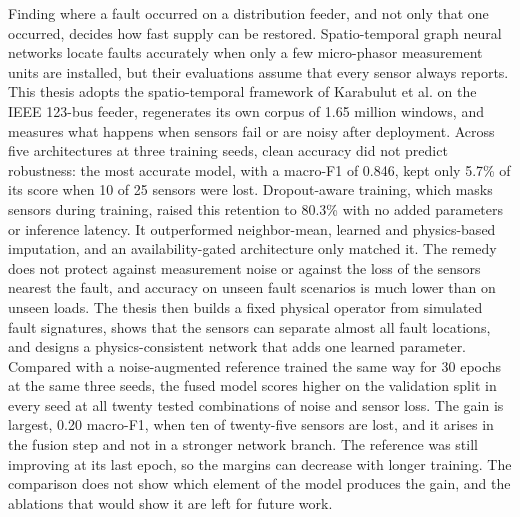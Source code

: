 \documentclass[MTech]{ugthesis}
\begin{document}
\abstract
\begin{doublespacing}
\normalfont
{\noindent Finding where a fault occurred on a distribution feeder, and not only that one occurred, decides how fast supply can be restored. Spatio-temporal graph neural networks locate faults accurately when only a few micro-phasor measurement units are installed, but their evaluations assume that every sensor always reports. This thesis adopts the spatio-temporal framework of Karabulut et al. on the IEEE 123-bus feeder, regenerates its own corpus of 1.65 million windows, and measures what happens when sensors fail or are noisy after deployment. Across five architectures at three training seeds, clean accuracy did not predict robustness: the most accurate model, with a macro-F1 of 0.846, kept only 5.7\% of its score when 10 of 25 sensors were lost. Dropout-aware training, which masks sensors during training, raised this retention to 80.3\% with no added parameters or inference latency. It outperformed neighbor-mean, learned and physics-based imputation, and an availability-gated architecture only matched it. The remedy does not protect against measurement noise or against the loss of the sensors nearest the fault, and accuracy on unseen fault scenarios is much lower than on unseen loads. The thesis then builds a fixed physical operator from simulated fault signatures, shows that the sensors can separate almost all fault locations, and designs a physics-consistent network that adds one learned parameter. Compared with a noise-augmented reference trained the same way for 30 epochs at the same three seeds, the fused model scores higher on the validation split in every seed at all twenty tested combinations of noise and sensor loss. The gain is largest, 0.20 macro-F1, when ten of twenty-five sensors are lost, and it arises in the fusion step and not in a stronger network branch. The reference was still improving at its last epoch, so the margins can decrease with longer training. The comparison does not show which element of the model produces the gain, and the ablations that would show it are left for future work.}
\end{doublespacing}

\pagebreak

\begin{singlespace}
\tableofcontents
\thispagestyle{empty}

\listoftables
{}
\listoffigures
{}
\end{singlespace}
\end{document}

